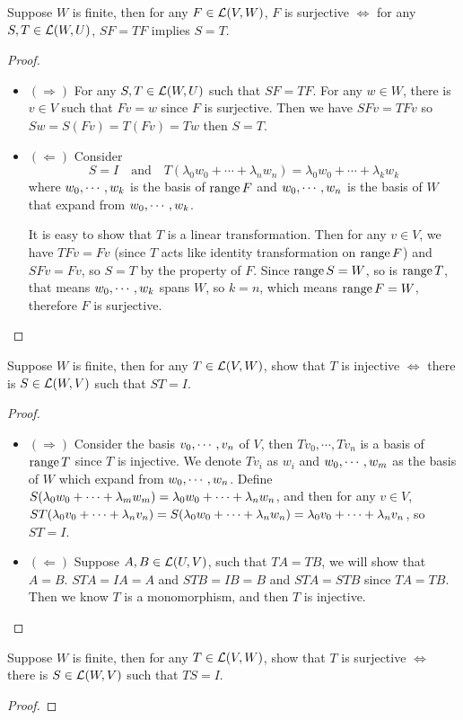 \documentclass[../main.tex]{subfiles}
\begin{document}
\begin{exercise*}
  Suppose $W$ is finite, then for any $F \in \LT(V, W)$, $F$ is surjective $\iff$ for any $S, T \in \LT(W, U)$, $SF = TF$ implies $S = T$.
\end{exercise*}
\begin{proof}
  ~
  \begin{itemize}
    \item $(\Rightarrow)$ For any $S, T \in \LT(W, U)$ such that $SF = TF$. For any $w \in W$,
          there is $v \in V$ such that $Fv = w$ since $F$ is surjective. Then we have
          $SFv = TFv$ so $Sw = S(Fv) = T(Fv) = Tw$ then $S = T$.
    \item $(\Leftarrow)$ Consider
          \[
          S = I \quad \text{and} \quad T(\lambda_0w_0 + \cdots + \lambda_n w_n) = \lambda_0w_0 + \cdots + \lambda_kw_k
          \]
          where $\join{w}{k}$ is the basis of $\rangev F$ and
          $\join{w}{n}$ is the basis of $W$ that expand from $\join{w}{k}$.

          It is easy to show that $T$ is a linear transformation. Then for any $v \in V$, we have
          $TFv = Fv$ (since $T$ acts like identity transformation on $\rangev F$) and $SFv = Fv$,
          so $S = T$ by the property of $F$. Since $\rangev S = W$, so is $\rangev T$, that means
          $\join{w}{k}$ spans $W$, so $k = n$, which means $\rangev F = W$, therefore $F$ is surjective.
  \end{itemize}
\end{proof}

\setcounter{exercise}{18}
\begin{exercise}
  Suppose $W$ is finite, then for any $T \in \LT(V, W)$,
  show that $T$ is injective $\iff$ there is $S \in \LT(W, V)$ such that $ST = I$.
\end{exercise}
\begin{proof}
  ~
  \begin{itemize}
    \item $(\Rightarrow)$ Consider the basis $\join{v}{n}$ of $V$, then $Tv_0, \cdots, Tv_n$
          is a basis of $\rangev T$ since $T$ is injective. We denote $Tv_i$ as $w_i$
          and $\join{w}{m}$ as the basis of $W$ which expand from $\join{w}{n}$.
          Define $S(\joinp[+]{\lambda}{w}{m}) = \joinp[+]{\lambda}{w}{n}$, and then for any
          $v \in V$, $ST(\joinp[+]{\lambda}{v}{n}) = S(\lambda_0w_0 + \cdots + \lambda_nw_n) = \joinp[+]{\lambda}{v}{n}$,
          so $ST = I$.
    \item $(\Leftarrow)$ Suppose $A, B \in \LT(U, V)$, such that $TA = TB$, we will show that $A = B$.
          $STA = IA = A$ and $STB = IB = B$ and $STA = STB$ since $TA = TB$.
          Then we know $T$ is a monomorphism, and then $T$ is injective.
  \end{itemize}
\end{proof}

\begin{exercise}
  Suppose $W$ is finite, then for any $T \in \LT(V, W)$,
  show that $T$ is surjective $\iff$ there is $S \in \LT(W, V)$ such that $TS = I$.
\end{exercise}
\begin{proof}
   
\end{proof}
\end{document}
